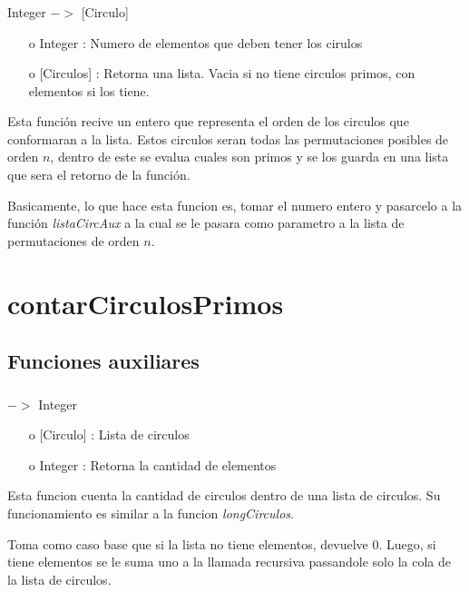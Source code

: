 \documentclass[10pt,journal]{IEEEtran}
\begin{document}
\subsubsection{\color{Red}{listaCirculosPrimos}}
\begin{description}[style=nextline]
        \item[\color{Green}{Signatura}] Integer $->$ [Circulo]  
        \begin{itemize}
        \item [o]  Integer : Numero de elementos que deben tener los cirulos
        \item [o] [Circulos] : Retorna una lista. Vacia si no tiene circulos primos, con elementos si los tiene.
        \end{itemize}        
        
        \item[\color{Green}{Descripción}]  Esta función recive un entero que representa el orden de los circulos que conformaran a la lista. Estos circulos seran todas las permutaciones posibles de orden   $n$, dentro de este se evalua cuales son primos y se los guarda en una lista que sera el retorno de la función.
        
        Basicamente, lo que hace esta funcion es, tomar el numero entero y pasarcelo a la función \textit{listaCircAux} a la cual se le pasara como parametro a la lista de permutaciones de orden $n$. 
\end{description}

\section{contarCirculosPrimos}
\subsection{Funciones auxiliares}
\subsubsection{\color{Red}{longitud1}}
\begin{description}[style=nextline]
        \item[\color{Green}{Signatura}] [Circulo] $->$ Integer
        \begin{itemize} 
        \item [o]  [Circulo] : Lista de circulos  
        \item [o]   Integer : Retorna la cantidad de elementos
        \end{itemize}        
        
        \item[\color{Green}{Descripción}]   Esta funcion cuenta la cantidad de circulos dentro de una lista de circulos. Su funcionamiento es similar a la funcion \textit{longCirculos}. 
        
        Toma como caso base que si la lista no tiene elementos, devuelve $0$. Luego, si tiene elementos se le suma uno a la llamada recursiva passandole solo la cola de la lista de circulos.
\end{description}
\end{document}
